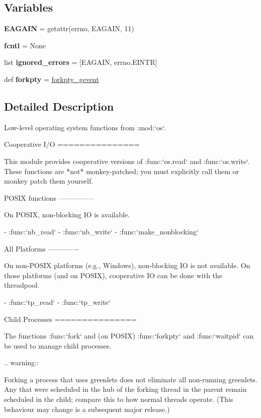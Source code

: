 \subsection*{Variables}
\begin{DoxyCompactItemize}
\item 
\mbox{\label{namespacegevent_1_1os_aedc9a2148b4c38a4cfaebe522ab9efc7}} 
{\bfseries E\+A\+G\+A\+IN} = getattr(errno, \textquotesingle{}E\+A\+G\+A\+IN\textquotesingle{}, 11)
\item 
\mbox{\label{namespacegevent_1_1os_ab7aad9683af2405447fd413dfd0cea0c}} 
{\bfseries fcntl} = None
\item 
\mbox{\label{namespacegevent_1_1os_ae4886d17856986449da59e9f9fef8603}} 
list {\bfseries ignored\+\_\+errors} = \mbox{[}E\+A\+G\+A\+IN, errno.\+E\+I\+N\+TR\mbox{]}
\item 
\mbox{\label{namespacegevent_1_1os_a4be4b87919eec33aa018cdab5dc5c072}} 
def {\bfseries forkpty} = \hyperlink{namespacegevent_1_1os_a3e04fb5e868290aae691fd3a3a85a77e}{forkpty\+\_\+gevent}
\end{DoxyCompactItemize}


\subsection{Detailed Description}
\begin{DoxyVerb}Low-level operating system functions from :mod:`os`.

Cooperative I/O
===============

This module provides cooperative versions of :func:`os.read` and
:func:`os.write`. These functions are *not* monkey-patched; you
must explicitly call them or monkey patch them yourself.

POSIX functions
---------------

On POSIX, non-blocking IO is available.

- :func:`nb_read`
- :func:`nb_write`
- :func:`make_nonblocking`

All Platforms
-------------

On non-POSIX platforms (e.g., Windows), non-blocking IO is not
available. On those platforms (and on POSIX), cooperative IO can
be done with the threadpool.

- :func:`tp_read`
- :func:`tp_write`

Child Processes
===============

The functions :func:`fork` and (on POSIX) :func:`forkpty` and :func:`waitpid` can be used
to manage child processes.

.. warning::

   Forking a process that uses greenlets does not eliminate all non-running
   greenlets. Any that were scheduled in the hub of the forking thread in the parent
   remain scheduled in the child; compare this to how normal threads operate. (This behaviour
   may change is a subsequent major release.)
\end{DoxyVerb}
 

